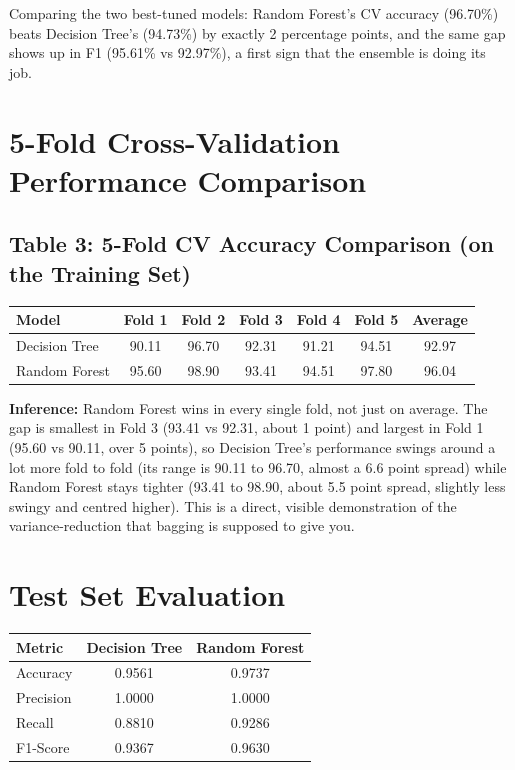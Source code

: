 \documentclass[12pt,a4paper]{article}
\begin{document}
Comparing the two best-tuned models: Random Forest's CV accuracy (96.70\%) beats Decision Tree's (94.73\%) by exactly 2 percentage points, and the same gap shows up in F1 (95.61\% vs 92.97\%), a first sign that the ensemble is doing its job.

\section{5-Fold Cross-Validation Performance Comparison}

\subsection*{Table 3: 5-Fold CV Accuracy Comparison (on the Training Set)}
\begin{tabular}{lcccccc}
\toprule
Model & Fold 1 & Fold 2 & Fold 3 & Fold 4 & Fold 5 & Average \\
\midrule
Decision Tree & 90.11 & 96.70 & 92.31 & 91.21 & 94.51 & 92.97 \\
Random Forest & 95.60 & 98.90 & 93.41 & 94.51 & 97.80 & 96.04 \\
\bottomrule
\end{tabular}

\textbf{Inference:} Random Forest wins in every single fold, not just on average. The gap is smallest in Fold 3 (93.41 vs 92.31, about 1 point) and largest in Fold 1 (95.60 vs 90.11, over 5 points), so Decision Tree's performance swings around a lot more fold to fold (its range is 90.11 to 96.70, almost a 6.6 point spread) while Random Forest stays tighter (93.41 to 98.90, about 5.5 point spread, slightly less swingy and centred higher). This is a direct, visible demonstration of the variance-reduction that bagging is supposed to give you.

\section{Test Set Evaluation}

\begin{tabular}{lcc}
\toprule
Metric & Decision Tree & Random Forest \\
\midrule
Accuracy & 0.9561 & 0.9737 \\
Precision & 1.0000 & 1.0000 \\
Recall & 0.8810 & 0.9286 \\
F1-Score & 0.9367 & 0.9630 \\
\bottomrule
\end{tabular}
\end{document}

